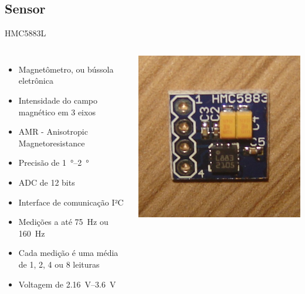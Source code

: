 \documentclass{beamer}
\begin{document}
\subsection{Sensor}

\begin{frame}{HMC5883L}
	\begin{columns}
		\pause
		\begin{itemize}[<+->]
			\item Magnetômetro, ou bússola eletrônica
			\item Intensidade do campo magnético em 3 eixos
			\item AMR - Anisotropic Magnetoresistance
			\item Precisão de \SIrange{1}{2}{\degree}
			\item ADC de 12 bits 
			\item Interface de comunicação I²C
			\item Medições a até \SI{75}{\hertz} ou \SI{160}{\hertz}
			\item Cada medição é uma média de 1, 2, 4 ou 8 leituras
			\item Voltagem de \SIrange{2.16}{3.6}{\volt}
		\end{itemize}

		\includegraphics[width=1.0\textwidth]{../monografia/img/sensor_front.jpg}


\end{columns}
\end{frame}
\end{document}
